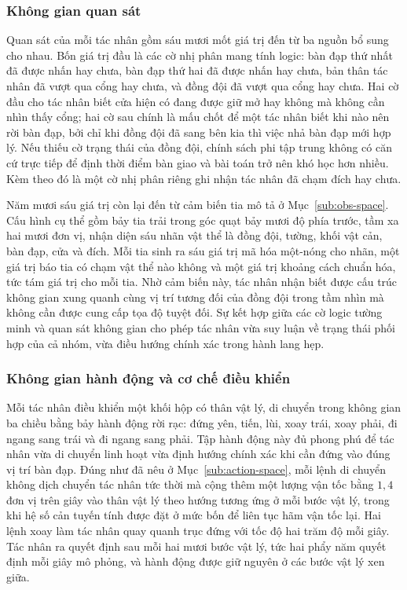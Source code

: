 \subsubsection{Không gian quan sát}
\label{sub:coop-obs}
\indent Quan sát của mỗi tác nhân gồm sáu mươi mốt giá trị đến từ ba nguồn bổ sung cho
nhau. Bốn giá trị đầu là các cờ nhị phân mang tính logic: bàn đạp thứ nhất đã được nhấn
hay chưa, bàn đạp thứ hai đã được nhấn hay chưa, bản thân tác nhân đã vượt qua cổng hay
chưa, và đồng đội đã vượt qua cổng hay chưa. Hai cờ đầu cho tác nhân biết cửa hiện có
đang được giữ mở hay không mà không cần nhìn thấy cổng; hai cờ sau chính là mấu chốt để
một tác nhân biết khi nào nên rời bàn đạp, bởi chỉ khi đồng đội đã sang bên kia thì
việc nhả bàn đạp mới hợp lý. Nếu thiếu cờ trạng thái của đồng đội, chính sách phi tập
trung không có căn cứ trực tiếp để định thời điểm bàn giao và bài toán trở nên khó học
hơn nhiều. Kèm theo đó là một cờ nhị phân riêng ghi nhận tác nhân đã chạm đích hay
chưa.

\indent Năm mươi sáu giá trị còn lại đến từ cảm biến tia mô tả ở
Mục~\ref{sub:obs-space}. Cấu hình cụ thể gồm bảy tia trải trong góc quạt bảy mươi độ
phía trước, tầm xa hai mươi đơn vị, nhận diện sáu nhãn vật thể là đồng đội, tường, khối
vật cản, bàn đạp, cửa và đích. Mỗi tia sinh ra sáu giá trị mã hóa một-nóng cho nhãn,
một giá trị báo tia có chạm vật thể nào không và một giá trị khoảng cách chuẩn hóa, tức
tám giá trị cho mỗi tia. Nhờ cảm biến này, tác nhân nhận biết được cấu trúc không gian
xung quanh cùng vị trí tương đối của đồng đội trong tầm nhìn mà không cần được cung cấp
tọa độ tuyệt đối. Sự kết hợp giữa các cờ logic tường minh và quan sát không gian cho
phép tác nhân vừa suy luận về trạng thái phối hợp của cả nhóm, vừa điều hướng chính xác
trong hành lang hẹp.

\subsubsection{Không gian hành động và cơ chế điều khiển}
\indent Mỗi tác nhân điều khiển một khối hộp có thân vật lý, di chuyển trong không gian
ba chiều bằng bảy hành động rời rạc: đứng yên, tiến, lùi, xoay trái, xoay phải, đi
ngang sang trái và đi ngang sang phải. Tập hành động này đủ phong phú để tác nhân vừa
di chuyển linh hoạt vừa định hướng chính xác khi cần đứng vào đúng vị trí bàn đạp. Đúng
như đã nêu ở Mục~\ref{sub:action-space}, mỗi lệnh di chuyển không dịch chuyển tác nhân
tức thời mà cộng thêm một lượng vận tốc bằng $1{,}4$ đơn vị trên giây vào thân vật lý
theo hướng tương ứng ở mỗi bước vật lý, trong khi hệ số cản tuyến tính được đặt ở mức
bốn để liên tục hãm vận tốc lại. Hai lệnh xoay làm tác nhân quay quanh trục đứng với
tốc độ hai trăm độ mỗi giây. Tác nhân ra quyết định sau mỗi hai mươi bước vật lý, tức
hai phẩy năm quyết định mỗi giây mô phỏng, và hành động được giữ nguyên ở các bước vật
lý xen giữa.

